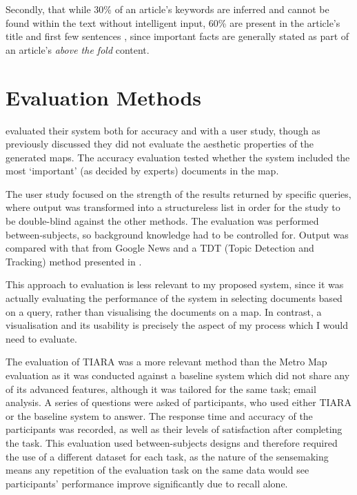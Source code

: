 Secondly, that while 30\% of an article's keywords are inferred and cannot be found within the text without intelligent input, 60\% are present in the article's title and first few sentences \citep{IdentifyingTopicsByPosition}, since important facts are generally stated as part of an article's \textit{above the fold} content.

\section{Evaluation Methods}
\citet{GeneratingInformationMaps} evaluated their system both for accuracy and with a user study, though as previously discussed they did not evaluate the aesthetic properties of the generated maps. The accuracy evaluation tested whether the system included the most `important' (as decided by experts) documents in the map. 

The user study focused on the strength of the results returned by specific queries, where output was transformed into a structureless list in order for the study to be double-blind against the other methods. The evaluation was performed between-subjects, so background knowledge had to be controlled for. Output was compared with that from Google News and a TDT (Topic Detection and Tracking) method presented in \citep{SemanticLanguageModelsForTDT}. 

This approach to evaluation is less relevant to my proposed system, since it was actually evaluating the performance of the system in selecting documents based on a query, rather than visualising the documents on a map. In contrast, a visualisation and its usability is precisely the aspect of my process which I would need to evaluate.


The evaluation of TIARA \citep{InteractiveTopicBasedVisualTextSummarizationAndAnalysis} was a more relevant method than the Metro Map evaluation as it was conducted against a baseline system which did not share any of its advanced features, although it was tailored for the same task; email analysis. A series of questions were asked of participants, who used either TIARA or the baseline system to answer. The response time and accuracy of the participants was recorded, as well as their levels of satisfaction after completing the task. This evaluation used between-subjects designs and therefore required the use of a different dataset for each task, as the nature of the sensemaking means any repetition of the evaluation task on the same data would see participants' performance improve significantly due to recall alone.

